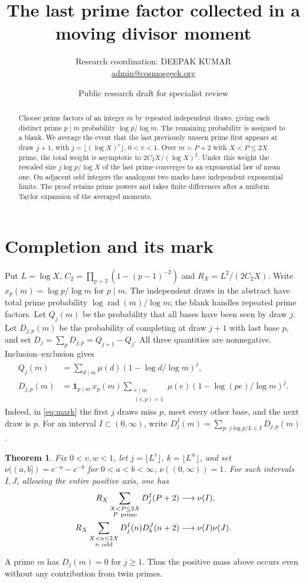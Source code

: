 \documentclass[11pt]{article}
\title{The last prime factor collected in a moving divisor moment}
\author{\small Research coordination: DEEPAK KUMAR\\
\small\href{mailto:admin@cosmosgeek.org}{admin@cosmosgeek.org}}
\date{Public research draft for specialist review}
\newtheorem{theorem}{Theorem}
\newcommand{\one}{\mathbf1}
\begin{document}
\maketitle
\begin{abstract}
Choose prime factors of an integer \(m\) by repeated independent draws, giving each distinct prime \(p\mid m\) probability \(\log p/\log m\). The remaining probability is assigned to a blank. We average the event that the last previously unseen prime first appears at draw \(j+1\), with \(j=\lfloor(\log X)^v\rfloor\), \(0<v<1\). Over \(m=P+2\) with \(X<P\le2X\) prime, the total weight is asymptotic to \(2C_2X/(\log X)^2\). Under this weight the rescaled size \(j\log p/\log X\) of the last prime converges to an exponential law of mean one. On adjacent odd integers the analogous two marks have independent exponential limits. The proof retains prime powers and takes finite differences after a uniform Taylor expansion of the averaged moments.
\end{abstract}

\section{Completion and its mark}
Put \(L=\log X\), \(C_2=\prod_{p>2}(1-(p-1)^{-2})\) and \(R_X=L^2/(2C_2X)\). Write \(x_p(m)=\log p/\log m\) for \(p\mid m\). The independent draws in the abstract have total prime probability \(\log\operatorname{rad}(m)/\log m\); the blank handles repeated prime factors. Let \(Q_j(m)\) be the probability that all bases have been seen by draw \(j\). Let \(D_{j,p}(m)\) be the probability of completing at draw \(j+1\) with last base \(p\), and set \(D_j=\sum_p D_{j,p}=Q_{j+1}-Q_j\). All three quantities are nonnegative. Inclusion--exclusion gives
\begin{align}
 Q_j(m)&=\sum_{d\mid m}\mu(d)(1-\log d/\log m)^j,\label{eq:Q}\\
 D_{j,p}(m)&=\one_{p\mid m}\, x_p(m)
 \sum_{\substack{e\mid m\\(e,p)=1}}\mu(e)
       (1-\log(pe)/\log m)^j.\label{eq:mark}
\end{align}
Indeed, in \eqref{eq:mark} the first \(j\) draws miss \(p\), meet every other base, and the next draw is \(p\). For an interval \(I\subset(0,\infty)\), write \(D_j^I(m)=\sum_{p:\,j\log p/L\in I}D_{j,p}(m)\).
\begin{theorem}
Fix \(0<v,w<1\), let \(j=\lfloor L^v\rfloor\), \(k=\lfloor L^w\rfloor\), and set \(\nu((a,b])=e^{-a}-e^{-b}\) for \(0<a<b<\infty\), \(\nu((0,\infty))=1\). For such intervals \(I,J\), allowing the entire positive axis, one has
\begin{align}
 R_X\sum_{\substack{X<P\le2X\\P\ {\rm prime}}}D_j^I(P+2)&\longrightarrow \nu(I),\\
 R_X\sum_{\substack{X<n\le2X\\n\ {\rm odd}}}D_j^I(n)D_k^J(n+2)&\longrightarrow \nu(I)\nu(J).
\end{align}
\end{theorem}
A prime \(m\) has \(D_j(m)=0\) for \(j\ge1\). Thus the positive mass above occurs even without any contribution from twin primes.
\end{document}
